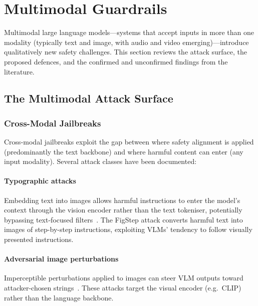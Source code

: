 \section{Multimodal Guardrails}
\label{sec:multimodal}

Multimodal large language models—systems that accept inputs in more than one
modality (typically text and image, with audio and video emerging)—introduce
qualitatively new safety challenges.
This section reviews the attack surface, the proposed defences, and the
confirmed and unconfirmed findings from the literature.

\subsection{The Multimodal Attack Surface}

\subsubsection{Cross-Modal Jailbreaks}

Cross-modal jailbreaks exploit the gap between where safety alignment is
applied (predominantly the text backbone) and where harmful content can enter
(any input modality).
Several attack classes have been documented:

\paragraph{Typographic attacks}
Embedding text into images allows harmful instructions to enter the model's context
through the vision encoder rather than the text tokeniser, potentially bypassing
text-focused filters~\cite{gong2023figstep}.
The FigStep attack converts harmful text into images of step-by-step instructions,
exploiting VLMs' tendency to follow visually presented instructions.

\paragraph{Adversarial image perturbations}
Imperceptible perturbations applied to images can steer VLM outputs toward
attacker-chosen strings~\cite{liu2023queryrelevant}.
These attacks target the visual encoder (e.g.\ CLIP) rather than the language
backbone.

